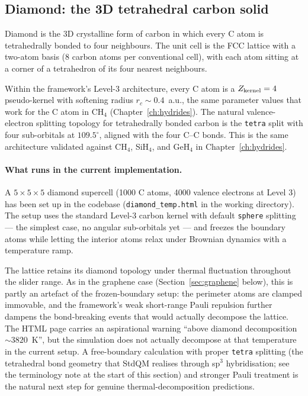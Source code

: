 \subsection{Diamond: the 3D tetrahedral carbon solid}

Diamond is the 3D crystalline form of carbon in which every C atom is tetrahedrally bonded to four neighbours. The unit cell is the FCC lattice with a two-atom basis (8 carbon atoms per conventional cell), with each atom sitting at a corner of a tetrahedron of its four nearest neighbours.

Within the framework's Level-3 architecture, every C atom is a $Z_{\rm kernel} = 4$ pseudo-kernel with softening radius $r_c \sim 0.4$~a.u., the same parameter values that work for the C atom in CH$_4$ (Chapter~\ref{ch:hydrides}). The natural valence-electron splitting topology for tetrahedrally bonded carbon is the \texttt{tetra} split with four sub-orbitals at $109.5^\circ$, aligned with the four C--C bonds. This is the same architecture validated against CH$_4$, SiH$_4$, and GeH$_4$ in Chapter~\ref{ch:hydrides}.

\paragraph{What runs in the current implementation.}
A $5 \times 5 \times 5$ diamond supercell (1000 C atoms, 4000 valence electrons at Level 3) has been set up in the codebase (\texttt{diamond\_temp.html} in the working directory). The setup uses the standard Level-3 carbon kernel with default \texttt{sphere} splitting --- the simplest case, no angular sub-orbitals yet --- and freezes the boundary atoms while letting the interior atoms relax under Brownian dynamics with a temperature ramp.

The lattice retains its diamond topology under thermal fluctuation throughout the slider range. As in the graphene case (Section~\ref{sec:graphene} below), this is partly an artefact of the frozen-boundary setup: the perimeter atoms are clamped immovable, and the framework's weak short-range Pauli repulsion further dampens the bond-breaking events that would actually decompose the lattice. The HTML page carries an aspirational warning ``above diamond decomposition $\sim 3820$~K'', but the simulation does not actually decompose at that temperature in the current setup. A free-boundary calculation with proper \texttt{tetra} splitting (the tetrahedral bond geometry that StdQM realises through sp$^3$ hybridisation; see the terminology note at the start of this section) and stronger Pauli treatment is the natural next step for genuine thermal-decomposition predictions.

